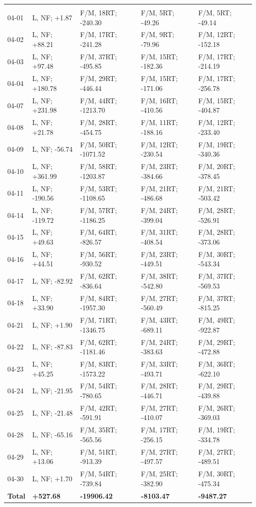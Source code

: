 \begin{table}[H]
\begin{tabular*}{\textwidth}{@{\extracolsep{\fill}} lllll}
\addlinespace[0.25em]
\midrule
\multicolumn{5}{@{}l}{\textbf{April 2025}}\\
04-01 & L, NF; +1.87 & F/M, 18RT; -240.30 & F/M, 5RT; -49.26 & F/M, 5RT; -49.14 \\
04-02 & L, NF; +88.21 & F/M, 17RT; -241.28 & F/M, 9RT; -79.96 & F/M, 12RT; -152.18 \\
04-03 & L, NF; +97.48 & F/M, 37RT; -495.85 & F/M, 15RT; -182.36 & F/M, 17RT; -214.19 \\
04-04 & L, NF; +180.78 & F/M, 29RT; -446.44 & F/M, 15RT; -171.06 & F/M, 17RT; -256.78 \\
04-07 & L, NF; +231.98 & F/M, 44RT; -1213.70 & F/M, 16RT; -410.56 & F/M, 15RT; -404.87 \\
04-08 & L, NF; +21.78 & F/M, 28RT; -454.75 & F/M, 11RT; -188.16 & F/M, 12RT; -233.40 \\
04-09 & L, NF; -56.74 & F/M, 50RT; -1071.52 & F/M, 12RT; -230.54 & F/M, 19RT; -340.36 \\
04-10 & L, NF; +361.99 & F/M, 58RT; -1203.87 & F/M, 23RT; -384.66 & F/M, 20RT; -378.45 \\
04-11 & L, NF; -190.56 & F/M, 53RT; -1108.65 & F/M, 21RT; -486.68 & F/M, 21RT; -503.42 \\
04-14 & L, NF; -119.72 & F/M, 57RT; -1186.25 & F/M, 24RT; -399.04 & F/M, 28RT; -526.91 \\
04-15 & L, NF; +49.63 & F/M, 64RT; -826.57 & F/M, 31RT; -408.54 & F/M, 28RT; -373.06 \\
04-16 & L, NF; +44.51 & F/M, 56RT; -930.52 & F/M, 23RT; -449.51 & F/M, 30RT; -543.34 \\
04-17 & L, NF; -82.92 & F/M, 62RT; -836.64 & F/M, 38RT; -542.80 & F/M, 37RT; -569.53 \\
04-18 & L, NF; +33.90 & F/M, 84RT; -1957.30 & F/M, 27RT; -560.49 & F/M, 37RT; -815.25 \\
04-21 & L, NF; +1.90 & F/M, 71RT; -1346.75 & F/M, 43RT; -689.11 & F/M, 49RT; -922.87 \\
04-22 & L, NF; -87.83 & F/M, 62RT; -1181.46 & F/M, 24RT; -383.63 & F/M, 29RT; -472.88 \\
04-23 & L, NF; +45.25 & F/M, 83RT; -1573.22 & F/M, 33RT; -493.71 & F/M, 36RT; -622.10 \\
04-24 & L, NF; -21.95 & F/M, 54RT; -780.65 & F/M, 28RT; -446.71 & F/M, 29RT; -439.88 \\
04-25 & L, NF; -21.48 & F/M, 42RT; -591.91 & F/M, 27RT; -410.07 & F/M, 26RT; -369.03 \\
04-28 & L, NF; -65.16 & F/M, 35RT; -565.56 & F/M, 17RT; -256.15 & F/M, 19RT; -334.78 \\
04-29 & L, NF; +13.06 & F/M, 51RT; -913.39 & F/M, 27RT; -497.57 & F/M, 27RT; -489.51 \\
04-30 & L, NF; +1.70 & F/M, 54RT; -739.84 & F/M, 25RT; -382.90 & F/M, 30RT; -475.34 \\
\textbf{Total} & \textbf{+527.68} & \textbf{-19906.42} & \textbf{-8103.47} & \textbf{-9487.27} \\


\end{tabular*}
\end{table}
